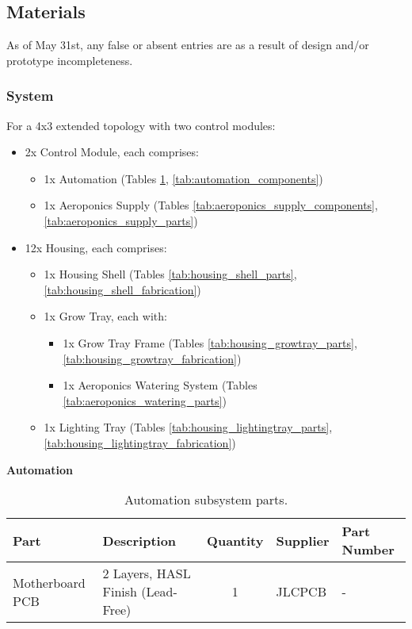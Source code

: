 \subsection{Materials}

As of May 31st, any false or absent entries are as a result of design and/or prototype incompleteness.

\subsubsection{System}

For a 4x3 extended topology with two control modules:
\begin{itemize}
    \item 2x Control Module, each comprises:
    \begin{itemize}
        \item 1x Automation (Tables \ref{tab:automation_parts}, \ref{tab:automation_components})
        \item 1x Aeroponics Supply (Tables \ref{tab:aeroponics_supply_components}, \ref{tab:aeroponics_supply_parts})
    \end{itemize}
    \item 12x Housing, each comprises:
    \begin{itemize}
        \item 1x Housing Shell (Tables \ref{tab:housing_shell_parts}, \ref{tab:housing_shell_fabrication})
        \item 1x Grow Tray, each with:
        \begin{itemize}
            \item 1x Grow Tray Frame (Tables \ref{tab:housing_growtray_parts}, \ref{tab:housing_growtray_fabrication})
            \item 1x Aeroponics Watering System (Tables \ref{tab:aeroponics_watering_parts})
        \end{itemize}
        \item 1x Lighting Tray (Tables \ref{tab:housing_lightingtray_parts}, \ref{tab:housing_lightingtray_fabrication})
    \end{itemize}
\end{itemize}

\clearpage

\textbf{Automation}
\begin{table}[!ht]
    \centering
    \begin{tabular}{|l|l|c|l|l|}
    \hline
        Part            & Description                       & Quantity  & Supplier  & Part Number  \\ \hline
        Motherboard PCB & 2 Layers, HASL Finish (Lead-Free) & 1         & JLCPCB    & -                     \\ \hline
    \end{tabular}
    \caption{Automation subsystem parts.}
    \label{tab:automation_parts}
\end{table}

